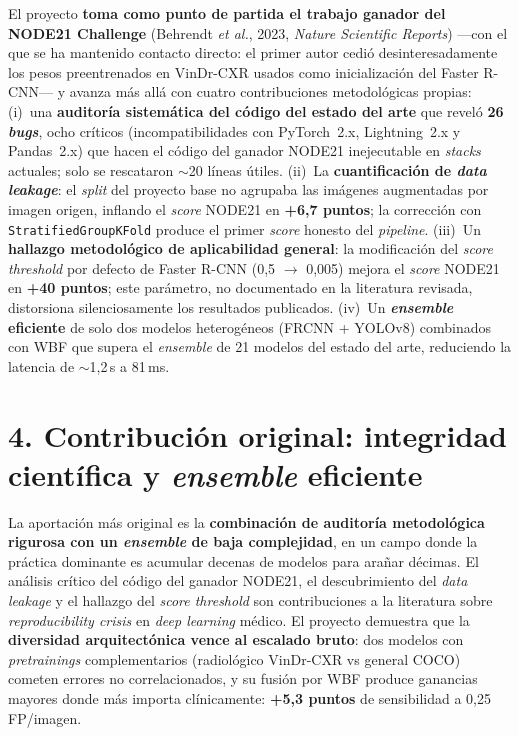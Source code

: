 \documentclass[11pt,a4paper]{article}
\begin{document}
El proyecto \textbf{toma como punto de partida el trabajo ganador del NODE21 Challenge} (Behrendt \emph{et al.}, 2023, \emph{Nature Scientific Reports}) ---con el que se ha mantenido contacto directo: el primer autor cedió desinteresadamente los pesos preentrenados en VinDr-CXR usados como inicialización del Faster R-CNN--- y avanza más allá con cuatro contribuciones metodológicas propias: (i)~una \textbf{auditoría sistemática del código del estado del arte} que reveló \textbf{26 \emph{bugs}}, ocho críticos (incompatibilidades con PyTorch~2.x, Lightning~2.x y Pandas~2.x) que hacen el código del ganador NODE21 inejecutable en \emph{stacks} actuales; solo se rescataron $\sim$20 líneas útiles. (ii)~La \textbf{cuantificación de \emph{data leakage}}: el \emph{split} del proyecto base no agrupaba las imágenes augmentadas por imagen origen, inflando el \emph{score} NODE21 en \textbf{+6{,}7 puntos}; la corrección con \texttt{StratifiedGroupKFold} produce el primer \emph{score} honesto del \emph{pipeline}. (iii)~Un \textbf{hallazgo metodológico de aplicabilidad general}: la modificación del \emph{score threshold} por defecto de Faster R-CNN (0{,}5 $\to$ 0{,}005) mejora el \emph{score} NODE21 en \textbf{+40 puntos}; este parámetro, no documentado en la literatura revisada, distorsiona silenciosamente los resultados publicados. (iv)~Un \textbf{\emph{ensemble} eficiente} de solo dos modelos heterogéneos (FRCNN + YOLOv8) combinados con WBF que supera el \emph{ensemble} de 21 modelos del estado del arte, reduciendo la latencia de $\sim$1{,}2\,s a 81\,ms.

\section*{4. Contribución original: integridad científica y \emph{ensemble} eficiente}

La aportación más original es la \textbf{combinación de auditoría metodológica rigurosa con un \emph{ensemble} de baja complejidad}, en un campo donde la práctica dominante es acumular decenas de modelos para arañar décimas. El análisis crítico del código del ganador NODE21, el descubrimiento del \emph{data leakage} y el hallazgo del \emph{score threshold} son contribuciones a la literatura sobre \emph{reproducibility crisis} en \emph{deep learning} médico. El proyecto demuestra que la \textbf{diversidad arquitectónica vence al escalado bruto}: dos modelos con \emph{pretrainings} complementarios (radiológico VinDr-CXR vs general COCO) cometen errores no correlacionados, y su fusión por WBF produce ganancias mayores donde más importa clínicamente: \textbf{+5{,}3 puntos} de sensibilidad a 0{,}25\,FP/imagen.
\end{document}
